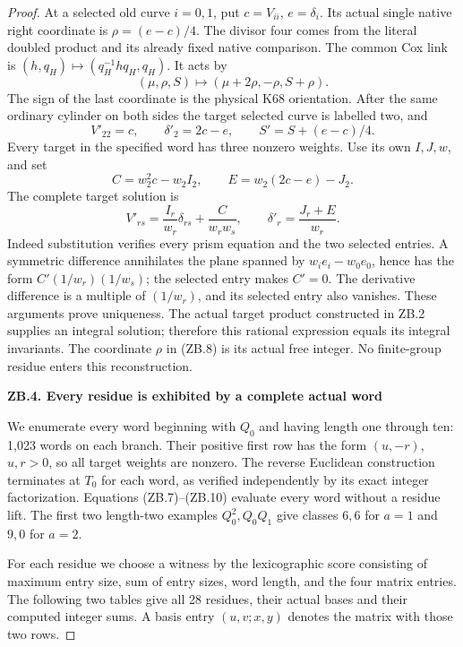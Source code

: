 \begin{proof}
At a selected old curve \(i=0,1\), put
\(c=V_{ii}\), \(e=\delta_i\). Its actual single native right
coordinate is \(\rho=(e-c)/4\). The divisor four comes from
the literal doubled product and its already fixed native comparison.
The common Cox link is
\((h,q_H)\mapsto(q_H^{-1}hq_H,q_H)\). It acts by
\[
(\mu,\rho,S)\longmapsto(\mu+2\rho,-\rho,S+\rho).
                                                               \tag{ZB.8}
\]
The sign of the last coordinate is the physical K68 orientation.
After the same ordinary cylinder on both sides the target selected
curve is labelled two, and
\[
V'_{22}=c,\qquad\delta'_2=2c-e,\qquad S'=S+(e-c)/4.
                                                               \tag{ZB.9}
\]
Every target in the specified word has three nonzero weights. Use its
own \(I,J,w\), and set
\[
C=w_2^2c-w_2I_2,\qquad E=w_2(2c-e)-J_2.
\]
The complete target solution is
\[
V'_{rs}=\frac{I_r}{w_r}\delta_{rs}+\frac{C}{w_rw_s},
\qquad\delta'_r=\frac{J_r+E}{w_r}.                       \tag{ZB.10}
\]
Indeed substitution verifies every prism equation and the two selected
entries. A symmetric difference annihilates the plane spanned by
\(w_i e_i-w_0e_0\), hence has the form
\(C'(1/w_r)(1/w_s)\); the selected entry makes \(C'=0\).
The derivative difference is a multiple of \((1/w_r)\), and its
selected entry also vanishes. These arguments prove uniqueness. The
actual target product constructed in ZB.2 supplies an integral
solution; therefore this rational expression equals its integral
invariants. The coordinate \(\rho\) in (ZB.8) is its actual free
integer. No finite-group residue enters this reconstruction.

\par

\medskip\noindent\textbf{ZB.4. Every residue is exhibited by a complete actual word}

\par\nopagebreak[4]

We enumerate every word beginning with \(Q_0\) and having length one
through ten: 1,023 words on each branch. Their positive first row has
the form \((u,-r)\), \(u,r>0\), so all target weights are nonzero.
The reverse Euclidean construction terminates at \(T_0\) for each
word, as verified independently by its exact integer factorization.
Equations (ZB.7)--(ZB.10) evaluate every word without a residue lift.
The first two length-two examples \(Q_0^2,Q_0Q_1\) give classes
\(6,6\) for \(a=1\) and \(9,0\) for \(a=2\).

For each residue we choose a witness by the lexicographic score
consisting of maximum entry size, sum of entry sizes, word length,
and the four matrix entries. The following two tables give all 28
residues, their actual bases and their computed integer sums. A basis
entry \((u,v;x,y)\) denotes the matrix with those two rows.


\end{proof}
